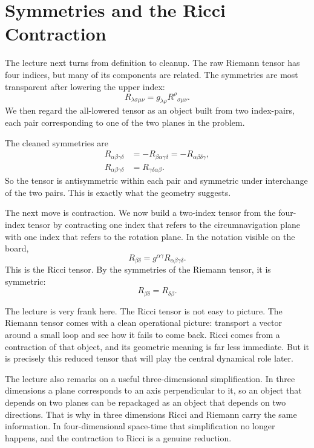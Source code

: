 \section{Symmetries and the Ricci Contraction}

The lecture next turns from definition to cleanup. The raw Riemann tensor has four indices, but many of its components are related. The symmetries are most transparent after lowering the upper index:
\begin{equation}
R_{\lambda\sigma\mu\nu}=g_{\lambda\rho}R^\rho{}_{\sigma\mu\nu}.
\end{equation}
We then regard the all-lowered tensor as an object built from two index-pairs, each pair corresponding to one of the two planes in the problem.

The cleaned symmetries are
\begin{align}
R_{\alpha\beta\gamma\delta}
&=
-R_{\beta\alpha\gamma\delta}
=
-R_{\alpha\beta\delta\gamma},
\\
R_{\alpha\beta\gamma\delta}
&=
R_{\gamma\delta\alpha\beta}.
\end{align}
So the tensor is antisymmetric within each pair and symmetric under interchange of the two pairs. This is exactly what the geometry suggests.

The next move is contraction. We now build a two-index tensor from the four-index tensor by contracting one index that refers to the circumnavigation plane with one index that refers to the rotation plane. In the notation visible on the board,
\begin{equation}
R_{\beta\delta}=g^{\alpha\gamma}R_{\alpha\beta\gamma\delta}.
\end{equation}
This is the Ricci tensor. By the symmetries of the Riemann tensor, it is symmetric:
\begin{equation}
R_{\beta\delta}=R_{\delta\beta}.
\end{equation}

The lecture is very frank here. The Ricci tensor is not easy to picture. The Riemann tensor comes with a clean operational picture: transport a vector around a small loop and see how it fails to come back. Ricci comes from a contraction of that object, and its geometric meaning is far less immediate. But it is precisely this reduced tensor that will play the central dynamical role later.

The lecture also remarks on a useful three-dimensional simplification. In three dimensions a plane corresponds to an axis perpendicular to it, so an object that depends on two planes can be repackaged as an object that depends on two directions. That is why in three dimensions Ricci and Riemann carry the same information. In four-dimensional space-time that simplification no longer happens, and the contraction to Ricci is a genuine reduction.

